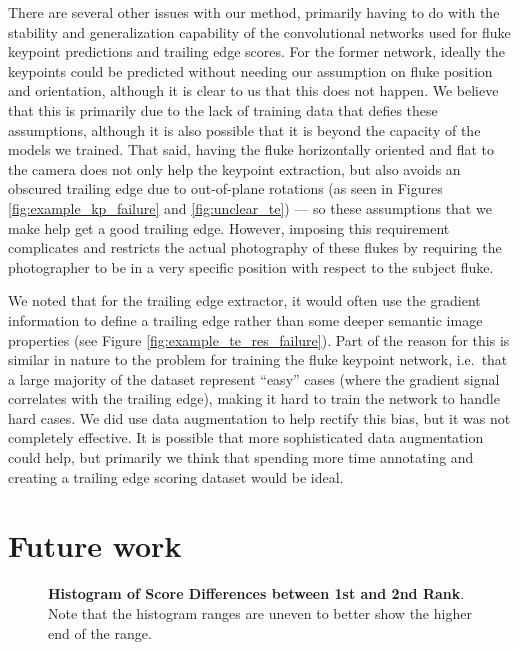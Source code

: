 There are several other issues with our method, primarily having to do with the stability and generalization capability of the convolutional networks used for fluke keypoint predictions and trailing edge scores.
For the former network, ideally the keypoints could be predicted without needing our assumption on fluke position and orientation, although it is clear to us that this does not happen.
We believe that this is primarily due to the lack of training data that defies these assumptions, although it is also possible that it is beyond the capacity of the models we trained.
That said, having the fluke horizontally oriented and flat to the camera does not only help the keypoint extraction, but also avoids an obscured trailing edge due to out-of-plane rotations (as seen in Figures \ref{fig:example_kp_failure} and \ref{fig:unclear_te}) --- so these assumptions that we make help get a good trailing edge.
However, imposing this requirement complicates and restricts the actual photography of these flukes by requiring the photographer to be in a very specific position with respect to the subject fluke.


We noted that for the trailing edge extractor, it would often use the gradient information to define a trailing edge rather than some deeper semantic image properties (see Figure \ref{fig:example_te_res_failure}).
Part of the reason for this is similar in nature to the problem for training the fluke keypoint network, i.e.\ that a large majority of the dataset represent ``easy'' cases (where the gradient signal correlates with the trailing edge), making it hard to train the network to handle hard cases.
We did use data augmentation to help rectify this bias, but it was not completely effective.
It is possible that more sophisticated data augmentation could help, but primarily we think that spending more time annotating and creating a trailing edge scoring dataset would be ideal.

\section{Future work}

\begin{figure*}[t]%
\centering
{}
\caption{\textbf{Histogram of Score Differences between 1st and 2nd Rank}. Note that the histogram ranges are uneven to better show the higher	end of the range.}
\label{fig:score_diff1st2nd}
\end{figure*}



